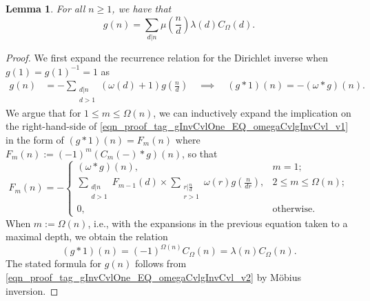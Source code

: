 \documentclass[11pt,reqno,a4letter]{article}
\numberwithin{equation}{section}
\numberwithin{figure}{section}
\numberwithin{table}{section}
\theoremstyle{plain}
\newtheorem{lemma}[theorem]{Lemma}
\numberwithin{theorem}{section}
\theoremstyle{definition}
\begin{document}
\begin{lemma} 
\label{lemma_AnExactFormulaFor_gInvByMobiusInv_v1} 
For all $n \geq 1$, we have that 
\[
g(n) = \sum_{d|n} \mu\left(\frac{n}{d}\right) \lambda(d) C_{\Omega}(d). 
\]
\end{lemma}
\begin{proof} 
We first expand the recurrence relation for the Dirichlet inverse 
when $g(1) = g(1)^{-1} = 1$ as 
\begin{align} 
\label{eqn_proof_tag_gInvCvlOne_EQ_omegaCvlgInvCvl_v1} 
g(n) & = - \sum_{\substack{d|n \\ d>1}} (\omega(d) + 1) g\left(\frac{n}{d}\right) 
     \quad\implies\quad 
     (g \ast 1)(n) = -(\omega \ast g)(n). 
\end{align} 
We argue that for $1 \leq m \leq \Omega(n)$, we can inductively expand the 
implication on the right-hand-side of \eqref{eqn_proof_tag_gInvCvlOne_EQ_omegaCvlgInvCvl_v1} 
in the form of $(g \ast 1)(n) = F_m(n)$ where 
$F_m(n) := (-1)^{m} (C_m(-) \ast g)(n)$, so that 
\[
F_m(n) = - 
     \begin{cases} 
     (\omega \ast g)(n), & m = 1; \\ 
     \sum\limits_{\substack{d|n \\ d > 1}} F_{m-1}(d) \times \sum\limits_{\substack{r|\frac{n}{d} \\ r > 1}} 
     \omega(r) g\left(\frac{n}{dr}\right), & 2 \leq m \leq \Omega(n); \\ 
     0, & \text{otherwise.} 
     \end{cases} 
\]
When $m := \Omega(n)$, i.e., with the expansions 
in the previous equation taken to a maximal depth, we obtain the relation 
\begin{equation} 
\label{eqn_proof_tag_gInvCvlOne_EQ_omegaCvlgInvCvl_v2} 
(g \ast 1)(n) = (-1)^{\Omega(n)} C_{\Omega}(n) = \lambda(n) C_{\Omega}(n). 
\end{equation} 
The stated formula for $g(n)$ follows from 
\eqref{eqn_proof_tag_gInvCvlOne_EQ_omegaCvlgInvCvl_v2} 
by M\"obius inversion. 
\end{proof} 
\end{document}
